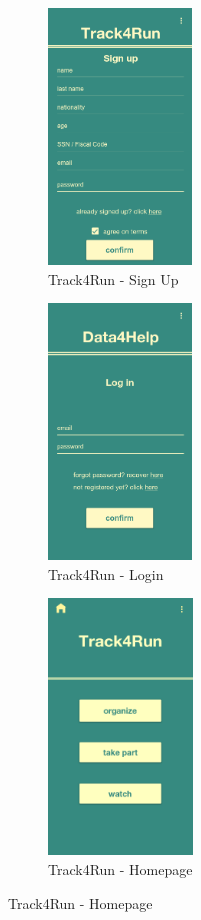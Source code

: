 \begin{figure}[H]
\centering
\begin{subfigure}{.33\textwidth}
  \centering
  \includegraphics[width=.9\linewidth, height = 6.8cm, keepaspectratio]{./Images/Mockups/Track4Run/T4R_SignUp.png}
  \caption{Track4Run - Sign Up}
\end{subfigure}%
\begin{subfigure}{.33\textwidth}
  \centering
  \includegraphics[width = .9\linewidth, height = 6.8cm, keepaspectratio]{./Images/Mockups/Track4Run/T4R_Login.png}
  \caption{Track4Run - Login}
\end{subfigure}
\begin{subfigure}{.33\textwidth}
  \centering
  \includegraphics[width = .9\linewidth, height = 6.8cm, keepaspectratio]{./Images/Mockups/Track4Run/T4R_Homepage.png}
  \caption{Track4Run - Homepage}
\end{subfigure}
\end{figure}

